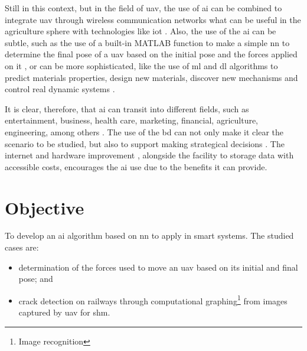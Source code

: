 Still in this context, but in the field of \gls*{uav}, the use of \gls*{ai} can be combined to integrate \gls*{uav} through wireless communication networks \citep{lahmeri2021} what can be useful in the agriculture sphere \citep{ahirwar2019} with technologies like \gls*{iot} \citep{verdouw2016,tzounis2017}.
Also, the use of the \gls*{ai} can be subtle, such as the use of a built-in MATLAB function to make a simple \gls*{nn} to determine the final pose of a \gls*{uav} based on the initial pose and the forces applied on it \citep{geronel2023}, or can be more sophisticated, like the use of \gls*{ml} and \gls*{dl} algorithms to predict materials properties, design new materials, discover new mechanisms and control real dynamic systems \citep{guo2021,assilian1974}.

It is clear, therefore, that \gls*{ai} can transit into different fields, such as entertainment, business, health care, marketing, financial, agriculture, engineering, among others \citep{ruiz-real2020,yu2018,davenport2019,verma2021,mhlanga2020,pannu2015,ghatrehsamani2023}. 
The use of the \gls*{bd} can not only make it clear the scenario to be studied, but also to support making strategical decisions \citep{jeble2018,koscielniak2015}.
The internet and hardware improvement \citep{baji2018}, alongside the facility to storage data with accessible costs, encourages the \gls*{ai} use due to the benefits it can provide.

\section{Objective}

To develop an \gls*{ai} algorithm based on \gls*{nn} to apply in smart systems.
The studied cases are: 
%
\begin{itemize}
    \item determination of the forces used to move an \gls*{uav} based on its initial and final pose; and
    \item crack detection on railways through computational graphing\footnote{Image recognition} from images captured by \gls*{uav} for \gls*{shm}.
\end{itemize}